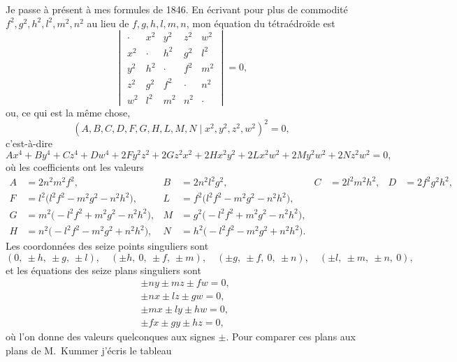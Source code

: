 \documentclass[11pt]{article}
\begin{document}
Je passe \`a pr\'esent \`a mes formules de 1846. En \'ecrivant pour plus de commodit\'e $f^{2}, g^{2}, h^{2}, l^{2}, m^{2}, n^{2}$ au lieu de $f, g, h, l, m, n$, mon \'equation du t\'etra\'edro\"ide est
\[
\begin{vmatrix}
\cdot & x^{2} & y^{2} & z^{2} & w^{2} \\
x^{2} & \cdot & h^{2} & g^{2} & l^{2} \\
y^{2} & h^{2} & \cdot & f^{2} & m^{2} \\
z^{2} & g^{2} & f^{2} & \cdot & n^{2} \\
w^{2} & l^{2} & m^{2} & n^{2} & \cdot
\end{vmatrix} = 0,
\]
ou, ce qui est la m\^eme chose,
\[
(A, B, C, D, F, G, H, L, M, N \mid x^{2}, y^{2}, z^{2}, w^{2})^{2} = 0,
\]
c'est-\`a-dire
\[
A x^{4} + B y^{4} + C z^{4} + D w^{4} + 2 F y^{2} z^{2} + 2 G z^{2} x^{2} + 2 H x^{2} y^{2} + 2 L x^{2} w^{2} + 2 M y^{2} w^{2} + 2 N z^{2} w^{2} = 0,
\]
o\`u les coefficients ont les valeurs
\begin{align*}
A &= 2 n^{2} m^{2} f^{2}, & B &= 2 n^{2} l^{2} g^{2}, & C &= 2 l^{2} m^{2} h^{2}, & D &= 2 f^{2} g^{2} h^{2}, \\
F &= l^{2}\bigl(l^{2} f^{2} - m^{2} g^{2} - n^{2} h^{2}\bigr), & L &= f^{2}\bigl(l^{2} f^{2} - m^{2} g^{2} - n^{2} h^{2}\bigr), \\
G &= m^{2}\bigl(- l^{2} f^{2} + m^{2} g^{2} - n^{2} h^{2}\bigr), & M &= g^{2}\bigl(- l^{2} f^{2} + m^{2} g^{2} - n^{2} h^{2}\bigr), \\
H &= n^{2}\bigl(- l^{2} f^{2} - m^{2} g^{2} + n^{2} h^{2}\bigr), & N &= h^{2}\bigl(- l^{2} f^{2} - m^{2} g^{2} + n^{2} h^{2}\bigr).
\end{align*}
Les coordonn\'ees des seize points singuliers sont
\[
(0,\ \pm h,\ \pm g,\ \pm l),\quad (\pm h,\ 0,\ \pm f,\ \pm m),\quad (\pm g,\ \pm f,\ 0,\ \pm n),\quad (\pm l,\ \pm m,\ \pm n,\ 0),
\]
et les \'equations des seize plans singuliers sont
\begin{align*}
& \pm n y \pm m z \pm f w = 0, \\
& \pm n x \pm l z \pm g w = 0, \\
& \pm m x \pm l y \pm h w = 0, \\
& \pm f x \pm g y \pm h z = 0,
\end{align*}
o\`u l'on donne des valeurs quelconques aux signes $\pm$. Pour comparer ces plans aux plans de M.~Kummer j'\'ecris le tableau
\end{document}

